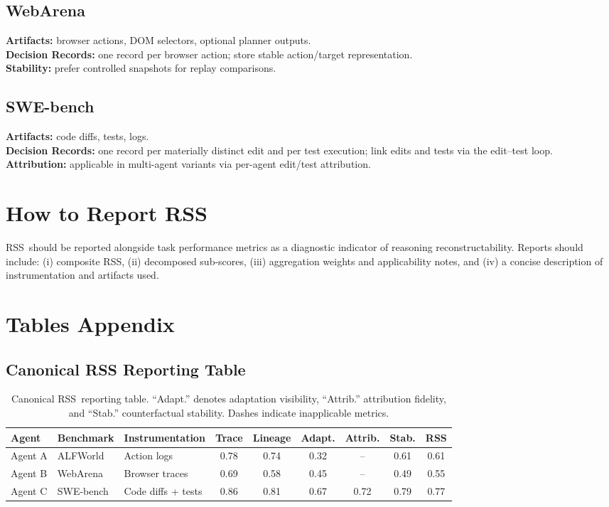 \documentclass[11pt]{article}
\newcommand{\RSS}{\textsc{RSS}}
\begin{document}
\subsection{WebArena}
\textbf{Artifacts:} browser actions, DOM selectors, optional planner outputs. \\
\textbf{Decision Records:} one record per browser action; store stable action/target representation. \\
\textbf{Stability:} prefer controlled snapshots for replay comparisons.

\subsection{SWE-bench}
\textbf{Artifacts:} code diffs, tests, logs. \\
\textbf{Decision Records:} one record per materially distinct edit and per test execution; link edits and tests via the edit--test loop. \\
\textbf{Attribution:} applicable in multi-agent variants via per-agent edit/test attribution.

\section{How to Report RSS}
\label{app:reporting}

\RSS\ should be reported alongside task performance metrics as a diagnostic indicator of reasoning reconstructability. Reports should include: (i) composite \RSS, (ii) decomposed sub-scores, (iii) aggregation weights and applicability notes, and (iv) a concise description of instrumentation and artifacts used.

\section{Tables Appendix}
\label{app:tables}

\subsection{Canonical RSS Reporting Table}

\begin{table}[t]
\centering
\begin{tabular}{l l l c c c c c c}
\toprule
Agent & Benchmark & Instrumentation &
Trace & Lineage & Adapt. & Attrib. & Stab. & RSS \\
\midrule
Agent A & ALFWorld & Action logs
& 0.78 & 0.74 & 0.32 & -- & 0.61 & 0.61 \\
Agent B & WebArena & Browser traces
& 0.69 & 0.58 & 0.45 & -- & 0.49 & 0.55 \\
Agent C & SWE-bench & Code diffs + tests
& 0.86 & 0.81 & 0.67 & 0.72 & 0.79 & 0.77 \\
\bottomrule
\end{tabular}
\caption{Canonical \RSS\ reporting table. ``Adapt.'' denotes adaptation visibility, ``Attrib.'' attribution fidelity, and ``Stab.'' counterfactual stability. Dashes indicate inapplicable metrics.}
\label{tab:rss_full}
\end{table}
\end{document}
